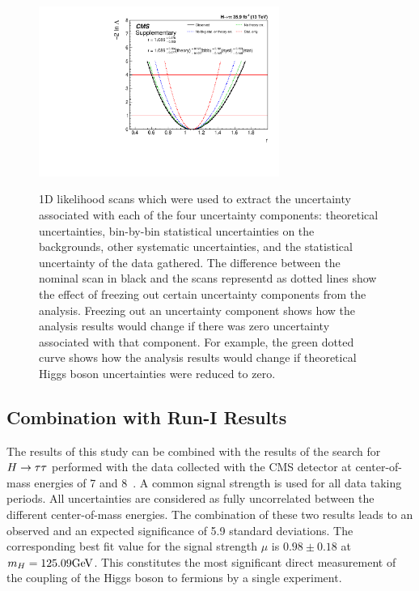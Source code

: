 \begin{figure}[htbp]
\centering
     \includegraphics[width=0.70\textwidth]{higgs_to_taus/plots/cms_output_freeze_All_Theory_bbb}\\
     \caption{
1D likelihood scans which were used to extract the uncertainty associated with each of the four uncertainty
components: theoretical uncertainties, bin-by-bin statistical uncertainties on the backgrounds, other 
systematic uncertainties, and the statistical uncertainty of the data gathered. The difference between
the nominal scan in black and the scans representd as dotted lines show the effect of freezing out certain
uncertainty components from the analysis. Freezing out an uncertainty component shows how the analysis
results would change if there was zero uncertainty associated with that component. For example, the green
dotted curve shows how the analysis results would change if theoretical Higgs boson uncertainties were
reduced to zero.
}
     \label{fig:htt_systematic_parabola}
\end{figure}


\subsection{Combination with Run-I Results}
The results of this study can be combined with the results of the search for $H\to\tau\tau$ performed with the data collected with 
the CMS detector at center-of-mass energies of 7 and 8\TeV~\cite{Khachatryan:2014jba}. A common signal strength is used
for all data taking periods. All uncertainties are considered as fully uncorrelated between the different 
center-of-mass energies. The combination of these two results leads to an observed and an expected significance of 5.9 standard 
deviations. The corresponding best fit value for the signal strength $\mu$ is $0.98\pm 0.18$ at 
$m_{H} = 125.09\mathrm{GeV}$. This constitutes the most significant direct measurement of the coupling of the Higgs boson 
to fermions by a single experiment.

